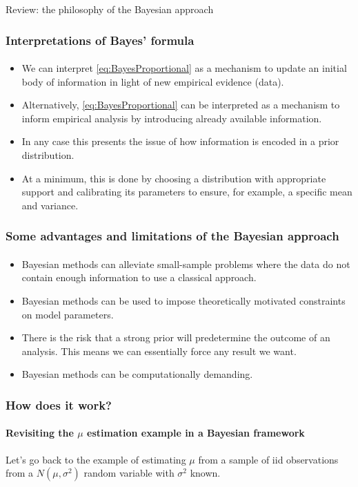\documentclass[10pt]{beamer}
\theoremstyle{definition}
\begin{document}
\begin{section}{Review: the philosophy of the Bayesian approach}
\begin{frame}[fragile]
\frametitle{Interpretations of Bayes' formula}
\framesubtitle{}
\begin{itemize}\itemsep1em
\item We can interpret \eqref{eq:BayesProportional} as a mechanism to update an initial body of information in light of new empirical evidence (data).
\item Alternatively, \eqref{eq:BayesProportional} can be interpreted as a mechanism to inform empirical analysis by introducing already available information.
\item In any case this presents the issue of how information is encoded in a prior distribution.
\item At a minimum, this is done by choosing a distribution with appropriate support and calibrating its parameters to ensure, for example, a specific mean and variance.
\end{itemize}
\end{frame}

\begin{frame}[fragile]
\frametitle{Some advantages and limitations of the Bayesian approach}
\framesubtitle{}
\begin{itemize}\itemsep1em
\item Bayesian methods can alleviate small-sample problems where the data do not contain enough information to use a classical approach.
\item Bayesian methods can be used to impose theoretically motivated constraints on model parameters.
\item There is the risk that a strong prior will predetermine the outcome of an analysis. This means we can essentially force any result we want.
\item Bayesian methods can be computationally demanding.
\end{itemize}
\end{frame}

\begin{frame}[fragile]
\frametitle{How does it work?}
\framesubtitle{Revisiting the $ \mu $ estimation example in a Bayesian framework}
Let's go back to the example of estimating $ \mu $ from a sample of iid observations from a $N(\mu,\sigma^2)$ random variable with $ \sigma^2 $ known. \bigskip


\end{frame}
\end{section}
\end{document}
